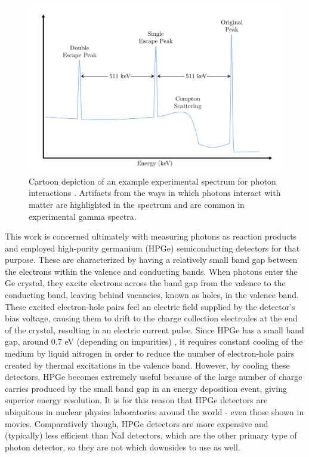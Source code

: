 \begin{figure}
\includegraphics[width=\linewidth]{figures/photonSpectrum.png}
\caption{Cartoon depiction of an example experimental spectrum for photon interactions \cite{Hall2018}. Artifacts from the ways in which photons interact with matter are highlighted in the spectrum and are common in experimental gamma spectra.   }
\label{fig: gammaSpec}
\end{figure}


This work is concerned ultimately with measuring photons as reaction products and employed high-purity germanium (HPGe) semiconducting detectors for that purpose. These are characterized by having a relatively small band gap between the electrons within the valence and conducting bands. When photons enter the Ge crystal, they excite electrons across the band gap from the valence to the conducting band, leaving behind vacancies, known as holes, in the valence band. These excited electron-hole pairs feel an electric field supplied by the detector's bias voltage, causing them to drift to the charge collection electrodes at the end of the crystal, resulting in an electric current pulse. Since HPGe has a small band gap, around 0.7 eV (depending on impurities) \cite{KnollBook}, it requires constant cooling of the medium by liquid nitrogen in order to reduce the number of electron-hole pairs created by thermal excitations in the valence band. However, by cooling these detectors, HPGe becomes extremely useful because of the large number of charge carries produced by the small band gap in an energy deposition event, giving superior energy resolution. It is for this reason that HPGe detectors are ubiquitous in nuclear physics laboratories around the world - even those shown in movies. Comparatively though, HPGe detectors are more expensive and (typically) less efficient than NaI detectors, which are the other primary type of photon detector, so they are not which downsides to use as well. 

